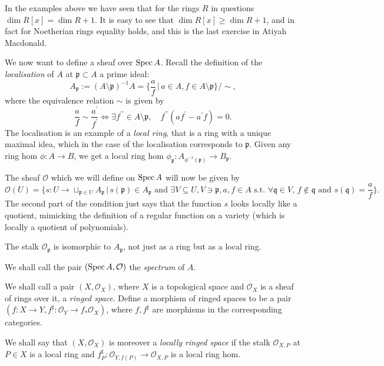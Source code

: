 \documentclass[000-main.tex]{subfiles}
\begin{document}
\begin{remark}
  In the examples above we have seen that for the rings $R$ in questions $\dim R[x] = \dim R + 1$.
  It is easy to see that $\dim R[x] \geq \dim R + 1$, and in fact for Noetherian rings equality holds, and this is the last exercise in Atiyah Macdonald.
\end{remark}

We now want to define a sheaf over $\operatorname{Spec} A$.
Recall the definition of the \emph{localisation} of $A$ at $\mathfrak{p} \subset A$ a prime ideal:
\[
  A_{\mathfrak{p}} := (A\setminus \mathfrak{p})^{-1} A = \lbrace \frac{a}{f} \, | \, a \in A, f \in A\setminus \mathfrak{p} \rbrace / \sim,
\]
where the equivalence relation $\sim$ is given by 
\[
  \frac{a}{f} \sim \frac{a^\prime}{f^\prime} \Leftrightarrow \exists f^{\prime \prime} \in A\setminus \mathfrak{p} , \quad f^{\prime \prime}(a f^\prime - a^\prime f) = 0.
\]
The localisation is an example of a \emph{local ring}, that is a ring with a unique maximal idea, which in the case of the localisation corresponds to $\mathfrak{p}$. Given any ring hom $\phi : A \to B$, we get a local ring hom $\phi_{\mathfrak{p}} : A_{\phi^{-1}(\mathfrak{p})} \to B_{\mathfrak{p}}$. 


The sheaf $\mathcal{O}$ which we will define on $\operatorname{Spec} A$ will now be given by 
\[
  \mathcal{O}(U) = \lbrace s : U \to \sqcup_{\mathfrak{p} \in U} A_{\mathfrak{p}} \, | \, s(\mathfrak{p}) \in A_{\mathfrak{p}} \text{ and } \exists V \subseteq U, V \ni \mathfrak{p}, a, f \in A \text{ s.t. } \forall \mathfrak{q} \in V, \, f \notin \mathfrak{q} \text{ and } s(\mathfrak{q}) = \frac{a}{f} \rbrace.
\]
The second part of the condition just says that the function $s$ looks locally like a quotient, mimicking the definition of a regular function on a variety (which is locally a quotient of polynomials). 

\begin{lemma}
  The stalk $\mathcal{O}_{\mathfrak{p}}$ is isomorphic to $A_{\mathfrak{p}}$, not just as a ring but as a local ring.
\end{lemma}

We shall call the pair $(\operatorname{Spec} A, \mathcal{O})$ the \emph{spectrum} of $A$. 

\begin{definition}
  We shall call a pair $(X, \mathcal{O}_X)$, where $X$ is a topological space and $\mathcal{O}_X$ is a sheaf of rings over it, a \emph{ringed space}.
  Define a morphism of ringed spaces to be a pair $(f : X \to Y, f^\sharp : \mathcal{O}_Y \to f_\ast \mathcal{O}_X)$, where $f, f^\sharp$ are morphisms in the corresponding categories.

  We shall say that $(X, \mathcal{O}_X)$ is moreover a \emph{locally ringed space} if the stalk $\mathcal{O}_{X, P}$ at $P \in X$ is a local ring and $f^\sharp_P : \mathcal{O}_{Y, f(P)} \to \mathcal{O}_{X, P}$ is a local ring hom.
\end{definition}
\end{document}
